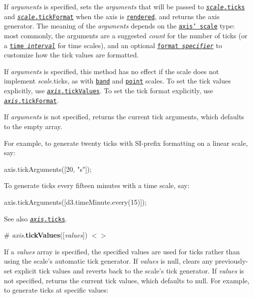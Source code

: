 If {\itshape arguments} is specified, sets the {\itshape arguments} that will be passed to \href{https://github.com/d3/d3-scale/blob/master/README.md#continuous_ticks}{\tt {\itshape scale}.ticks} and \href{https://github.com/d3/d3-scale/blob/master/README.md#continuous_tickFormat}{\tt {\itshape scale}.tick\+Format} when the axis is \href{#_axis}{\tt rendered}, and returns the axis generator. The meaning of the {\itshape arguments} depends on the \href{#axis_scale}{\tt axis’ scale} type\+: most commonly, the arguments are a suggested {\itshape count} for the number of ticks (or a \href{https://github.com/d3/d3-time}{\tt time {\itshape interval}} for time scales), and an optional \href{https://github.com/d3/d3-format}{\tt format {\itshape specifier}} to customize how the tick values are formatted.

If {\itshape arguments} is specified, this method has no effect if the scale does not implement {\itshape scale}.ticks, as with \href{https://github.com/d3/d3-scale/blob/master/README.md#band-scales}{\tt band} and \href{https://github.com/d3/d3-scale/blob/master/README.md#point-scales}{\tt point} scales. To set the tick values explicitly, use \href{#axis_tickValues}{\tt {\itshape axis}.tick\+Values}. To set the tick format explicitly, use \href{#axis_tickFormat}{\tt {\itshape axis}.tick\+Format}.

If {\itshape arguments} is not specified, returns the current tick arguments, which defaults to the empty array.

For example, to generate twenty ticks with S\+I-\/prefix formatting on a linear scale, say\+:


\begin{DoxyCode}
axis.tickArguments([20, "s"]);
\end{DoxyCode}


To generate ticks every fifteen minutes with a time scale, say\+:


\begin{DoxyCode}
axis.tickArguments([d3.timeMinute.every(15)]);
\end{DoxyCode}


See also \href{#axis_ticks}{\tt {\itshape axis}.ticks}.

\label{_axis_tickValues}%
\# {\itshape axis}.{\bfseries tick\+Values}(\mbox{[}{\itshape values}\mbox{]}) \href{https://github.com/d3/d3-axis/blob/master/src/axis.js#L132}{\tt $<$$>$}

If a {\itshape values} array is specified, the specified values are used for ticks rather than using the scale’s automatic tick generator. If {\itshape values} is null, clears any previously-\/set explicit tick values and reverts back to the scale’s tick generator. If {\itshape values} is not specified, returns the current tick values, which defaults to null. For example, to generate ticks at specific values\+:


